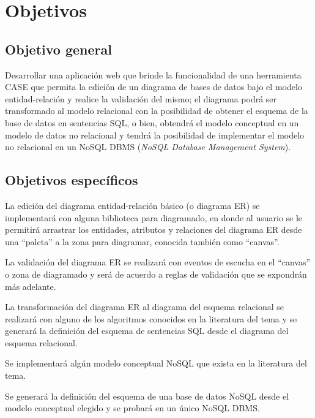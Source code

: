 \section{Objetivos}

\subsection*{Objetivo general}
Desarrollar una aplicación web que brinde la funcionalidad de una herramienta CASE que permita la edición de un diagrama de bases de datos bajo el modelo entidad-relación y realice la validación del mismo; el diagrama podrá ser transformado al modelo relacional con la posibilidad de obtener el esquema de la base de datos en sentencias SQL, o bien, obtendrá el modelo conceptual en un modelo de datos no relacional y tendrá la posibilidad de implementar el modelo no relacional en un NoSQL DBMS (\textit{NoSQL Database Management System}).

\subsection*{Objetivos específicos}

La edición del diagrama entidad-relación básico (o diagrama ER) se implementará con alguna biblioteca para diagramado, en donde al usuario se le permitirá arrastrar los entidades, atributos y relaciones del diagrama ER desde una ``paleta''  a la zona para diagramar, conocida también como ``canvas''.


La validación del diagrama ER se realizará con eventos de escucha en el ``canvas'' o zona de diagramado y será de acuerdo a reglas de validación que se expondrán más adelante.


La transformación del diagrama ER al diagrama del esquema relacional se realizará con alguno de los algoritmos conocidos en la literatura del tema y se generará la definición del esquema de sentencias SQL desde el diagrama del esquema relacional.


Se implementará algún modelo conceptual NoSQL que exista en la literatura del tema.


Se generará la definición del esquema de una base de datos NoSQL desde el modelo conceptual elegido y se probará en un único NoSQL DBMS.